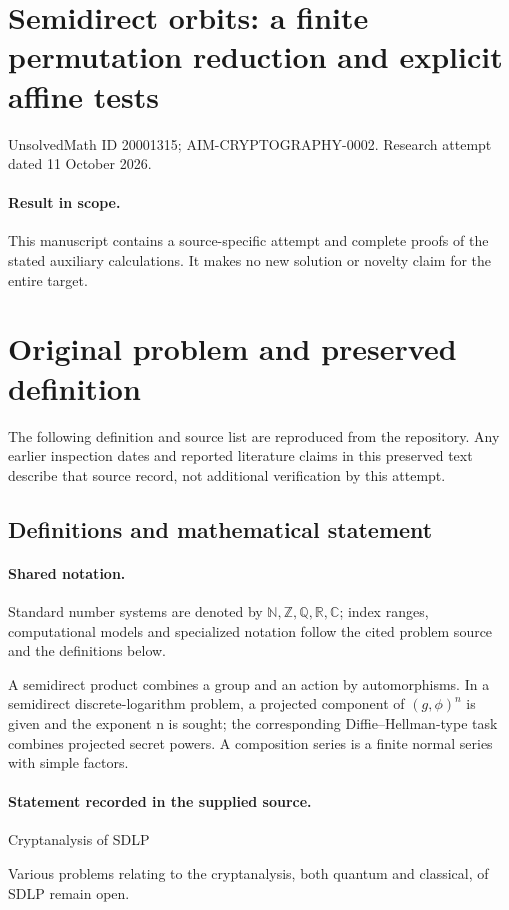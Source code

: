 \documentclass[11pt]{article}
\begin{document}
\section*{Semidirect orbits: a finite permutation reduction and explicit affine tests}
\noindent UnsolvedMath ID 20001315; AIM-CRYPTOGRAPHY-0002. Research attempt dated 11 October 2026.
\paragraph{Result in scope.}This manuscript contains a source-specific attempt and complete proofs of the stated auxiliary calculations. It makes no new solution or novelty claim for the entire target.
\section{Original problem and preserved definition}
The following definition and source list are reproduced from the repository. Any earlier inspection dates and reported literature claims in this preserved text describe that source record, not additional verification by this attempt.
\subsection{Definitions and mathematical statement}

\paragraph{Shared notation.}Standard number systems are denoted by $\mathbb N,\mathbb Z,\mathbb Q,\mathbb R,\mathbb C$; index ranges, computational models and specialized notation follow the cited problem source and the definitions below.


A semidirect product combines a group and an action by automorphisms. In a semidirect discrete-logarithm problem, a projected component of $(g,\phi)^n$ is given and the exponent n is sought; the corresponding Diffie--Hellman-type task combines projected secret powers. A composition series is a finite normal series with simple factors.
\paragraph{Statement recorded in the supplied source.}
Cryptanalysis of SDLP

Various problems relating to the cryptanalysis, both quantum and classical, of SDLP remain open.
\end{document}
